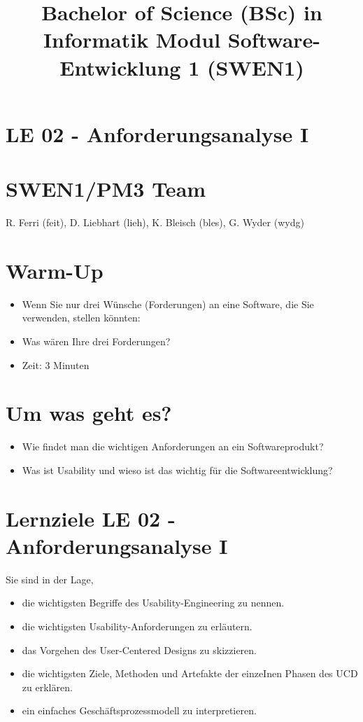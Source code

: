 \documentclass[10pt]{article}
\title{Bachelor of Science (BSc) in Informatik Modul Software-Entwicklung 1 (SWEN1) }
\author{}
\date{}
\begin{document}
\maketitle
\section*{LE 02 - Anforderungsanalyse I}
\section*{SWEN1/PM3 Team}
R. Ferri (feit), D. Liebhart (lieh), K. Bleisch (bles), G. Wyder (wydg)

\section*{Warm-Up}
\begin{itemize}
  \item Wenn Sie nur drei Wünsche (Forderungen) an eine Software, die Sie verwenden, stellen könnten:
  \item Was wären Ihre drei Forderungen?
  \item Zeit: 3 Minuten
\end{itemize}

\section*{Um was geht es?}
\begin{itemize}
  \item Wie findet man die wichtigen Anforderungen an ein Softwareprodukt?
  \item Was ist Usability und wieso ist das wichtig für die Softwareentwicklung?
\end{itemize}

\section*{Lernziele LE 02 - Anforderungsanalyse I}
Sie sind in der Lage,

\begin{itemize}
  \item die wichtigsten Begriffe des Usability-Engineering zu nennen.
  \item die wichtigsten Usability-Anforderungen zu erläutern.
  \item das Vorgehen des User-Centered Designs zu skizzieren.
  \item die wichtigsten Ziele, Methoden und Artefakte der einzeInen Phasen des UCD zu erklären.
  \item ein einfaches Geschäftsprozessmodell zu interpretieren.
\end{itemize}
\end{document}
